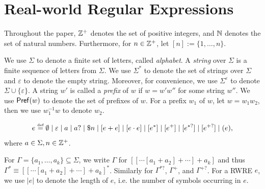 
\section{Real-world Regular Expressions}\label{sec-rwre}


Throughout the paper, $\mathbb{Z}^+$ denotes the set of positive integers, and  $\mathbb{N}$ denotes the set of natural numbers. Furthermore, for $n\in \mathbb{Z}^+$, let $[n]:=\{1, \ldots, n\}$. 

We use $\Sigma$ to denote a finite set of letters, called \emph{alphabet}. A \emph{string} over $\Sigma$ is a finite sequence of letters from $\Sigma$. We use $\Sigma^*$ to denote the set of strings over $\Sigma$ and $\varepsilon$ to denote the empty string. Moreover, for convenience, we use $\Sigma^\varepsilon$ to denote $\Sigma \cup \{\varepsilon\}$. A string $w'$ is called a \emph{prefix} of $w$ if $w = w'w''$ for some string $w''$. We use $\mathsf{Pref}(w)$ to denote the set of prefixes of $w$. For a prefix $w_1$ of $w$, let $w = w_1 w_2$, then we use $w_1^{-1}w$ to denote $w_2$.


  
\begin{definition}
  	\[e \eqdef \emptyset \mid \varepsilon \mid a \mid a? \mid \$n \mid [e + e] \mid [e \concat e] \mid [e^*] \mid [e^+] \mid [e^{*?}] \mid  [e^{+?}] \mid (e), \]
  	where $a \in \Sigma, n \in \mathbb{Z}^+$. 
\end{definition}
For $\Gamma = \{a_1, \ldots, a_k\}\subseteq \Sigma$, we write $\Gamma$ for  $[[\cdots [a_1 + a_2] + \cdots] + a_k]$ and thus $\Gamma^\ast \equiv [[\cdots [a_1 + a_2] + \cdots] + a_k]^\ast$. Similarly for $\Gamma^{\ast?}$, $\Gamma^+$, and $\Gamma^{+?}$. For a RWRE $e$, we use $|e|$ to denote the length of $e$, i.e. the number of symbols occurring in $e$.

